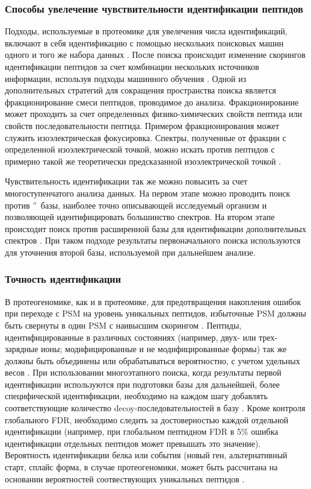 \subsubsection{Способы увелечение чувствительности идентификации пептидов}
Подходы, используемые в протеомике для увелечения числа идентификаций, включают в себя идентификацию с помощью нескольких поисковых машин одного и того же набора данных \cite{shteynberg2013combining}. После поиска происходит изменение скорингов идентификации пептидов за счет комбинации нескольких источников информации, используя подходы машинного обучения \cite{nesvizhskii2010survey}. Одной из дополнительных стратегий для сокращения пространства поиска является фракционирование смеси пептидов, проводимое до  анализа. Фракционирование может проходить за счет определенных физико-химических свойств пептида или свойств последовательности пептида. Примером фракционирования может служить изоэлектрическая фокусировка. Спектры, полученные от фракции с определенной изоэлектрической точкой, можно искать против пептидов с примерно такой же теоретически предсказанной изоэлектрической точкой \cite{branca2014hirief}. 

Чувствительность идентификации так же можно повысить за счет многоступенчатого анализа данных. На первом этапе можно проводить поиск против \textquotedblright\ базы, наиболее точно описывающей исследуемый организм и позволяющей идентифицировать большинство спектров. На втором этапе происходит поиск против расширенной базы для идентификации дополнительных спектров \cite{ning2010computational, helmy2012mass}. При таком подходе результаты первоначального поиска используются для уточнения второй базы, используемой при дальнейшем анализе. 

\subsubsection{Точность идентификации}
В протеогеномике, как и в протеомике, для предотвращения накопления ошибок при переходе с PSM на уровень уникальных пептидов, избыточные PSM должны быть свернуты в один PSM с наивысшим скорингом \cite{nesvizhskii2010survey}. Пептиды, идентифицированные в различных состояниях (например, двух- или трех-зарядные ионы; модифицированные и не модифицированные формы) так же должны быть объединены или обрабатываться вероятностно, с учетом удельных весов \cite{shteynberg2011iprophet}. При использовании многоэтапного поиска, когда результаты первой идентификации используются при подготовки базы для дальнейшей, более специфической идентификации, необходимо на каждом шагу добавлять соответствующие количество decoy-последовательностей в базу \cite{nesvizhskii2010survey}. Кроме контроля глобального FDR, необходимо следить за достоверностью каждой отдельной идентификации (например, при глобальном пептидном FDR в 5\% ошибка идентификации отдельных пептидов может превышать это значение). Вероятность идентификации белка или события (новый ген, альтернативный старт, сплайс форма, в случае протеогеномики, может быть рассчитана на основании вероятностей соотвествующих уникальных пептидов \cite{shteynberg2011iprophet, castellana2010proteogenomics}.

